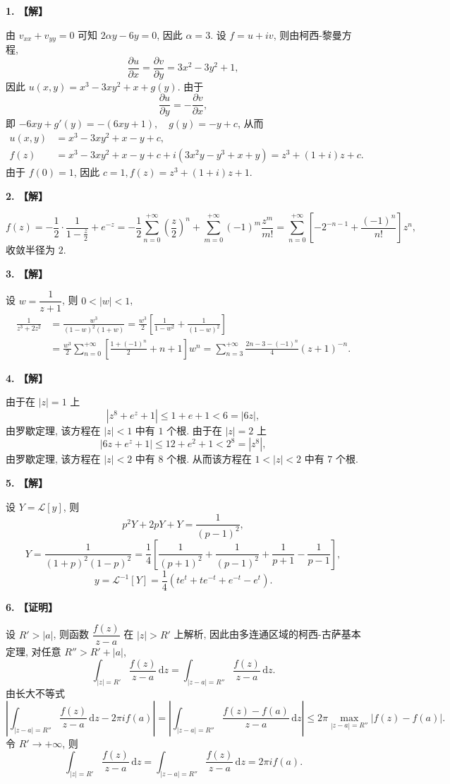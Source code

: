 \documentclass[simple]{hfutexam}
\newcommand{\diff}{\,\mathrm{d}}
\newcommand\msl{\mathscr{L}}
\begin{document}

\textbf{1. 【解】}

由 $v_{xx}+v_{yy}=0$ 可知 $2\alpha y-6y=0$, 因此 $\alpha=3$.
设 $f=u+iv$, 则由柯西-黎曼方程,
  \[\frac{\partial u}{\partial x}=\frac{\partial v}{\partial y}=3x^2-3y^2+1,\]
因此 $u(x,y)=x^3-3xy^2+x+g(y)$.
由于
  \[\frac{\partial u}{\partial y}=-\frac{\partial v}{\partial x},\]
即 $-6xy+g'(y)=-(6xy+1),\quad g(y)=-y+c$, 从而
\begin{align*}
u(x,y)&=x^3-3xy^2+x-y+c,\\
f(z)&=x^3-3xy^2+x-y+c+i(3x^2y-y^3+x+y)
  =z^3+(1+i)z+c.
\end{align*}
由于 $f(0)=1$, 因此 $c=1,f(z)=z^3+(1+i)z+1$.

\textbf{2. 【解】}

\[f(z)=-\frac{1}{2}\cdot\frac{1}{1-\frac z2}+e^{-z}
=-\frac{1}{2}\sum_{n=0}^{+\infty} \left(\frac{z}{2}\right)^n+\sum_{m=0}^{+\infty} (-1)^m\frac{z^m}{m!}
=\sum_{n=0}^{+\infty} \left[-2^{-n-1}+\frac{(-1)^n}{n!}\right]z^n,\]
收敛半径为 $2$.

\textbf{3. 【解】}

设 $w=\dfrac1{z+1}$, 则 $0<|w|<1$,
\begin{align*}
\frac{1}{z^3+2z^2}&=\frac{w^3}{(1-w)^2(1+w)}=\frac{w^3}{2}\left[\frac{1}{1-w^2}+\frac{1}{(1-w)^2}\right]\\
&=\frac{w^3}{2}\sum_{n=0}^{+\infty}\left[\frac{1+(-1)^n}{2}+n+1\right]w^n
=\sum_{n=3}^{+\infty}\frac{2n-3-(-1)^n}{4}(z+1)^{-n}.
\end{align*}

\textbf{4. 【解】}

由于在 $|z|=1$ 上
\[|z^8+e^z+1|\le 1+e+1<6=|6z|,\]
由罗歇定理, 该方程在 $|z|<1$ 中有 $1$ 个根. 由于在 $|z|=2$ 上
\[|6z+e^z+1|\le 12+e^2+1<2^8=|z^8|,\]
由罗歇定理, 该方程在 $|z|<2$ 中有 $8$ 个根.
从而该方程在 $1<|z|<2$ 中有 $7$ 个根.

\textbf{5. 【解】}

设 $Y=\msl[y]$, 则
\[p^2Y+2pY+Y=\frac{1}{(p-1)^2},\]
\[Y=\frac{1}{(1+p)^2(1-p)^2}=\frac{1}{4}\left[\frac{1}{(p+1)^2}+\frac{1}{(p-1)^2}+\frac{1}{p+1}-\frac{1}{p-1}\right],\]
\[y=\msl^{-1}[Y]=\frac{1}{4}(te^t+te^{-t}+e^{-t}-e^t).\]

\textbf{6. 【证明】}

设 $R'>|a|$, 则函数 $\dfrac{f(z)}{z-a}$ 在 $|z|>R'$ 上解析, 因此由多连通区域的柯西-古萨基本定理, 对任意 $R''>R'+|a|$,
  \[\int_{|z|=R'} \frac{f(z)}{z-a}\diff z=\int_{|z-a|=R''} \frac{f(z)}{z-a}\diff z.\]
由长大不等式
  \[\left|\int_{|z-a|=R''} \frac{f(z)}{z-a}\diff z-2\pi if(a)\right|
  =\left|\int_{|z-a|=R''} \frac{f(z)-f(a)}{z-a}\diff z\right|
  \le 2\pi \max_{|z-a|=R''}|f(z)-f(a)|.  \]
令 $R'\to+\infty$, 则 
  \[\int_{|z|=R'} \frac{f(z)}{z-a}\diff z=\int_{|z-a|=R''} \frac{f(z)}{z-a}\diff z=2\pi if(a).\]
\end{document}
